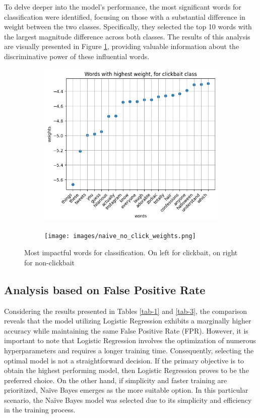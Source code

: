 \documentclass{class}
\begin{document}
To delve deeper into the model's performance, the most significant words for classification were identified,
focusing on those with a substantial difference in weight between the two classes.
Specifically, they selected the top 10 words with the largest magnitude difference across both classes.
The results of this analysis are visually presented in Figure \ref{fig-13},
providing valuable information about the discriminative power of these influential words.
\begin{figure}[h]
    \begin{subfigure}{.5\linewidth}
        \includegraphics[width=\linewidth]{images/naive_click_weights.png}
    \end{subfigure}%
    \begin{subfigure}{.5\linewidth}
        \texttt{[image: images/naive\_no\_click\_weights.png]}
    \end{subfigure}
    \caption{Most impactful words for classification. On left for clickbait, on right for non-clickbait}
    \label{fig-13}
\end{figure}

\subsection{Analysis based on False Positive Rate}
Considering the results presented in Tables \ref{tab-1} and \ref{tab-3}, the comparison reveals that
the model utilizing Logistic Regression exhibits a marginally higher accuracy while maintaining the same False Positive Rate (FPR).
However, it is important to note that Logistic Regression involves the optimization of numerous hyperparameters and requires a longer training time.
Consequently, selecting the optimal model is not a straightforward decision. If the primary objective is to obtain the highest performing model,
then Logistic Regression proves to be the preferred choice.
On the other hand, if simplicity and faster training are prioritized,
Na\"ive Bayes emerges as the more suitable option. In this particular scenario, the Na\"ive Bayes model was selected due to its simplicity and efficiency
in the training process.
\end{document}
